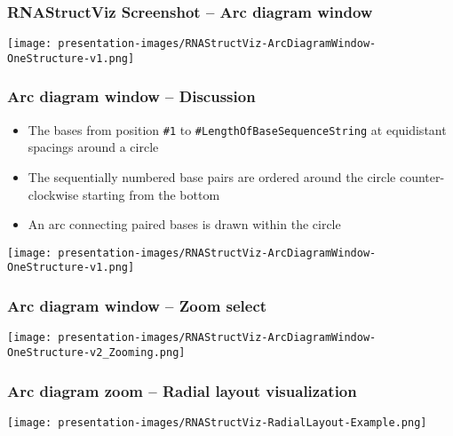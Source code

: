 \documentclass[usenames,svgnames,dvipsnames,11pt]{beamer}
\begin{document}
\begin{frame}[fragile]
\frametitle{RNAStructViz Screenshot -- Arc diagram window}

\begin{center}
\texttt{[image: presentation-images/RNAStructViz-ArcDiagramWindow-OneStructure-v1.png]}
\end{center}

\end{frame}

\begin{frame}
\frametitle{Arc diagram window -- Discussion}

\begin{itemize} 

\item The bases from position \texttt{\#1} to \texttt{\#LengthOfBaseSequenceString} at 
      equidistant spacings around a circle 
\item The sequentially numbered base pairs are ordered around the circle counter-clockwise 
      starting from the bottom 
\item An arc connecting paired bases is drawn within the circle 

\end{itemize}

\begin{center}
\texttt{[image: presentation-images/RNAStructViz-ArcDiagramWindow-OneStructure-v1.png]}
\end{center}

\end{frame}

\begin{frame}[fragile]
\frametitle{Arc diagram window -- Zoom select}

\begin{center}
\texttt{[image: presentation-images/RNAStructViz-ArcDiagramWindow-OneStructure-v2\_Zooming.png]}
\end{center}

\end{frame}

\begin{frame}[fragile]
\frametitle{Arc diagram zoom -- Radial layout visualization}

\begin{center}
\texttt{[image: presentation-images/RNAStructViz-RadialLayout-Example.png]}
\end{center}

\end{frame}
\end{document}
